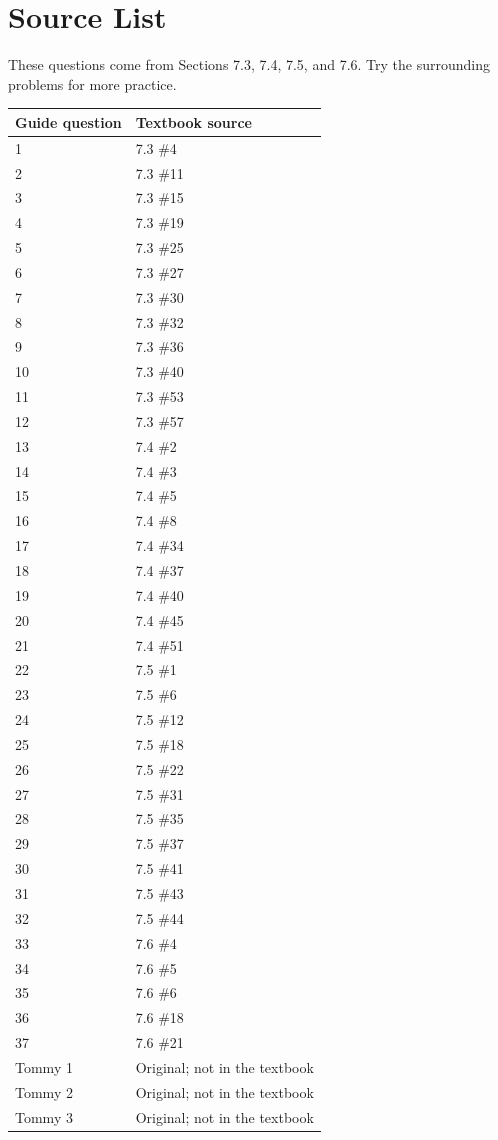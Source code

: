 \documentclass[11pt]{article}
\begin{document}
\section*{Source List}
These questions come from Sections 7.3, 7.4, 7.5, and 7.6. Try the surrounding problems for more practice.
\medskip
\begin{center}\small\setlength{\tabcolsep}{15pt}\renewcommand{\arraystretch}{0.91}\begin{tabular}{ll}\hline
Guide question & Textbook source\\\hline
1 & 7.3 \#4\\
2 & 7.3 \#11\\
3 & 7.3 \#15\\
4 & 7.3 \#19\\
5 & 7.3 \#25\\
6 & 7.3 \#27\\
7 & 7.3 \#30\\
8 & 7.3 \#32\\
9 & 7.3 \#36\\
10 & 7.3 \#40\\
11 & 7.3 \#53\\
12 & 7.3 \#57\\
\hline
13 & 7.4 \#2\\
14 & 7.4 \#3\\
15 & 7.4 \#5\\
16 & 7.4 \#8\\
17 & 7.4 \#34\\
18 & 7.4 \#37\\
19 & 7.4 \#40\\
20 & 7.4 \#45\\
21 & 7.4 \#51\\
\hline
22 & 7.5 \#1\\
23 & 7.5 \#6\\
24 & 7.5 \#12\\
25 & 7.5 \#18\\
26 & 7.5 \#22\\
27 & 7.5 \#31\\
28 & 7.5 \#35\\
29 & 7.5 \#37\\
30 & 7.5 \#41\\
31 & 7.5 \#43\\
32 & 7.5 \#44\\
\hline
33 & 7.6 \#4\\
34 & 7.6 \#5\\
35 & 7.6 \#6\\
36 & 7.6 \#18\\
37 & 7.6 \#21\\
\hline
Tommy 1 & Original; not in the textbook\\
Tommy 2 & Original; not in the textbook\\
Tommy 3 & Original; not in the textbook\\\hline
\end{tabular}\end{center}
\end{document}
